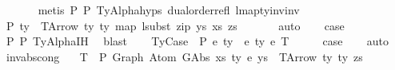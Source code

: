 \begin{isabellebody}
\ \ \ \ \ \isamarkupfalse%
\ {\isacharparenleft}{\kern0pt}metis\ P{}{}\ P{}{}\ TyAlpha{\isachardot}{\kern0pt}hyps{\isacharparenleft}{\kern0pt}{}{\isacharcomma}{\kern0pt}{}{\isacharcomma}{\kern0pt}{}{\isacharparenright}{\kern0pt}\ dual{\isacharunderscore}{\kern0pt}order{\isachardot}{\kern0pt}refl\ lmap{\isacharunderscore}{\kern0pt}ty{\isacharunderscore}{\kern0pt}inv{\isacharunderscore}{\kern0pt}inv{\isacharparenright}{\kern0pt}\isanewline
\ \ \isamarkupfalse%
\ \isamarkupfalse%
\ P{}{}{\isacharcolon}{\kern0pt}\ {\isachardoublequoteopen}ty{\isacharprime}{\kern0pt}\ {\isacharequal}{\kern0pt}\ TArrow\ ty{}\ ty{}\ {\isacharparenleft}{\kern0pt}map\ {\isacharparenleft}{\kern0pt}lsubst\ {\isacharparenleft}{\kern0pt}zip\ ys{\isacharprime}{\kern0pt}\ xs{\isacharprime}{\kern0pt}{\isacharparenright}{\kern0pt}{\isacharparenright}{\kern0pt}\ zs{\isacharparenright}{\kern0pt}{\isachardoublequoteclose}\isanewline
\ \ \ \ \ \isamarkupfalse%
\ auto\isanewline
\isanewline
\ \ \isamarkupfalse%
\ {\isacharquery}{\kern0pt}case\isanewline
\ \ \ \ \isamarkupfalse%
\ P{}{}\ P{}\ TyAlpha{\isachardot}{\kern0pt}IH\ \isamarkupfalse%
\ blast\isanewline
{}\isamarkupfalse%
\isanewline
\ \ \isamarkupfalse%
\ {\isacharparenleft}{\kern0pt}TyCase\ {\isasymGamma}\ P\ e{}\ ty{}\ {\isasymGamma}{}\ e{}\ ty{}\ e{}\ T{\isacharparenright}{\kern0pt}\isanewline
\ \ \isamarkupfalse%
\ \isamarkupfalse%
\ {\isacharquery}{\kern0pt}case\isanewline
\ \ \isamarkupfalse%
\ auto\isanewline
{}\isamarkupfalse%
%
\endisatagproof
{\isafoldproof}%
%
\isadelimproof
\isanewline
%
\endisadelimproof
\isanewline
\isanewline
{}\isamarkupfalse%
\ inv{\isacharunderscore}{\kern0pt}abs{\isacharunderscore}{\kern0pt}cong{}{\isacharcolon}{\kern0pt}\isanewline
\ \ \ T{\isacharcolon}{\kern0pt}\ {\isachardoublequoteopen}{\isasymGamma}\ {\isasymturnstile}{\isacharbraceleft}{\kern0pt}P{\isacharbraceright}{\kern0pt}\ {\isacharparenleft}{\kern0pt}Graph\ {\isacharparenleft}{\kern0pt}Atom\ {\isacharparenleft}{\kern0pt}GAbs\ xs\ ty{}{\isacharprime}{\kern0pt}\ e{\isacharparenright}{\kern0pt}\ ys{\isacharparenright}{\kern0pt}{\isacharparenright}{\kern0pt}\ {\isacharcolon}{\kern0pt}\ {\isacharparenleft}{\kern0pt}TArrow\ ty{}\ ty{}\ zs{\isacharparenright}{\kern0pt}{\isachardoublequoteclose}\isanewline

\end{isabellebody}
